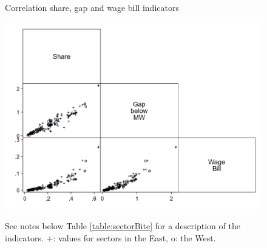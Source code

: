 \begin{figure}[htbp]
    \centering
    \caption{Correlation share, gap and wage bill indicators}
    \includegraphics[width=0.70\paperwidth]{Images/shareGapWbi.png}
    \label{fig:correlationIndicators}
    \caption*{See notes below Table \ref{table:sectorBite} for a description of the indicators. +: values for sectors in the East, o: the West.}
\end{figure}

